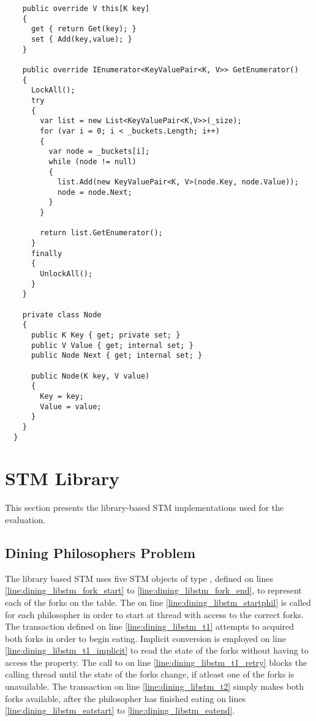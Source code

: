 \begin{lstlisting}
    public override V this[K key]
    {
      get { return Get(key); }
      set { Add(key,value); }
    }

    public override IEnumerator<KeyValuePair<K, V>> GetEnumerator()
    {
      LockAll();
      try
      {
        var list = new List<KeyValuePair<K,V>>(_size);
        for (var i = 0; i < _buckets.Length; i++)
        {
          var node = _buckets[i];
          while (node != null)
          {
            list.Add(new KeyValuePair<K, V>(node.Key, node.Value));
            node = node.Next;
          }
        }

        return list.GetEnumerator();
      }
      finally
      {
        UnlockAll();
      }
    }

    private class Node
    {
      public K Key { get; private set; }
      public V Value { get; internal set; }
      public Node Next { get; internal set; }

      public Node(K key, V value)
      {
        Key = key;
        Value = value;
      }
    }
  }
\end{lstlisting}
\section{STM Library}\label{app:impl_stm_lib}
This section presents the library-based \ac{STM} implementations used for the evaluation.
\subsection{Dining Philosophers Problem}
The library based \ac{STM} uses five \ac{STM} objects of type , defined on lines \ref{line:dining_libstm_fork_start} to \ref{line:dining_libstm_fork_end}, to represent each of the forks on the table. The  on line \ref{line:dining_libstm_startphil} is called for each philosopher in order to start at thread with access to the correct forks. The transaction defined on line \ref{line:dining_libstm_t1} attempts to acquired both forks in order to begin eating. Implicit conversion is employed on line \ref{line:dining_libstm_t1_implicit} to read the state of the forks without having to access the  property. The call to  on line \ref{line:dining_libstm_t1_retry} blocks the calling thread until the state of the forks change, if atleast one of the forks is unavailable. The transaction on line \ref{line:dining_libstm_t2} simply makes both forks available, after the philosopher has finished eating on lines \ref{line:dining_libstm_eatstart} to \ref{line:dining_libstm_eatend}.

